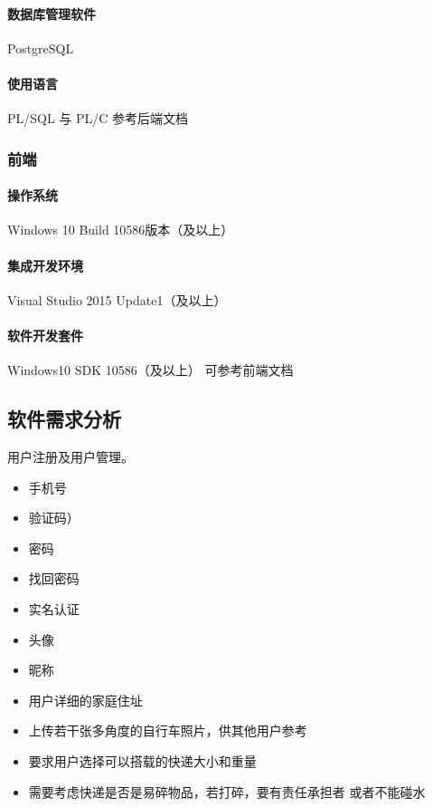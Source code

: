 \documentclass[UTF8]{dingo}
\begin{document}
        \paragraph{数据库管理软件} PostgreSQL
        \paragraph{使用语言} PL/SQL 与 PL/C
     参考后端文档
    \subsubsection{前端}
      \paragraph{操作系统} Windows 10 Build 10586版本（及以上）
      \paragraph{集成开发环境} Visual Studio 2015 Update1（及以上）
      \paragraph{软件开发套件} Windows10 SDK 10586（及以上）
      可参考前端文档
    \subsection{软件需求分析}
      用户注册及用户管理。
      \begin{itemize}
        \item 手机号
        \item 验证码）
        \item 密码
        \item 找回密码
        \item 实名认证
        \item 头像
        \item 昵称
        \item 用户详细的家庭住址
        \item 上传若干张多角度的自行车照片，供其他用户参考
        \item 要求用户选择可以搭载的快递大小和重量
        \item 需要考虑快递是否是易碎物品，若打碎，要有责任承担者 或者不能碰水
      \end{itemize}
\end{document}
